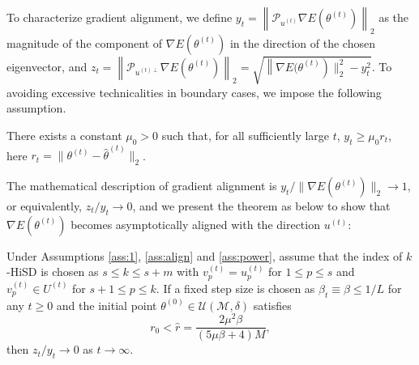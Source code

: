 \documentclass[final]{siamart251216}
\begin{document}
To characterize gradient alignment, we define 
$y_{t} =\left\|\mathcal{P}_{u^{(t)}}\nabla E(\theta^{(t)})\right\|_{2}$ as the magnitude of the component of $\nabla E(\theta^{(t)})$ in the direction of the chosen eigenvector,
and $z_{t} =\left\|\mathcal{P}_{u^{(t)\perp}}\nabla E(\theta^{(t)})\right\|_{2}=\sqrt{\left\|\nabla E(\theta^{(t)}\right)\|_2^2-y_t^2}$.
To avoiding excessive technicalities in boundary cases, we impose the following assumption.
\begin{assumption}\label{ass:power}
There exists a constant $\mu_0>0$ such that, for all sufficiently large $t$, $y_{t}\geqslant \mu_{0} r_{t}$, here $r_t = \|\theta^{(t)} - \hat{\theta}^{(t)}\|_2$.
\end{assumption}
The mathematical description of gradient alignment is 
$y_t/\|\nabla E(\theta^{(t)})\|_2 \to 1$, or equivalently, $z_t/y_t \to 0$, and we present the theorem as below to show that $\nabla E(\theta^{(t)})$ becomes asymptotically aligned with the direction $u^{(t)}$:
\begin{theorem}
\label{thm:gradient_alignment}
Under Assumptions \ref{ass:1}, \ref{ass:align} and \ref{ass:power}, assume that the index of $k$-HiSD is chosen as $s\leqslant k\leqslant s+m$ with 
$v_p^{(t)}=u_p^{(t)}$ for $1\leqslant p\leqslant s$ 
and $v_p^{(t)} \in U^{(t)}$ for $s+1\leqslant p\leqslant k$.
If a fixed step size is chosen as $\beta_t \equiv \beta \leqslant 1/L $ for any $t\geqslant 0$ and the initial point $\theta^{(0)}\in \mathcal{U}(\mathcal{M},\delta)$ satisfies
\begin{equation}
r_0<\hat{r}=\frac{2\mu^2 \beta}{(5\mu\beta+4)M},
\end{equation}
then 
$z_t/y_t \to 0$ as $t\to\infty$.
\end{theorem}
\end{document}
